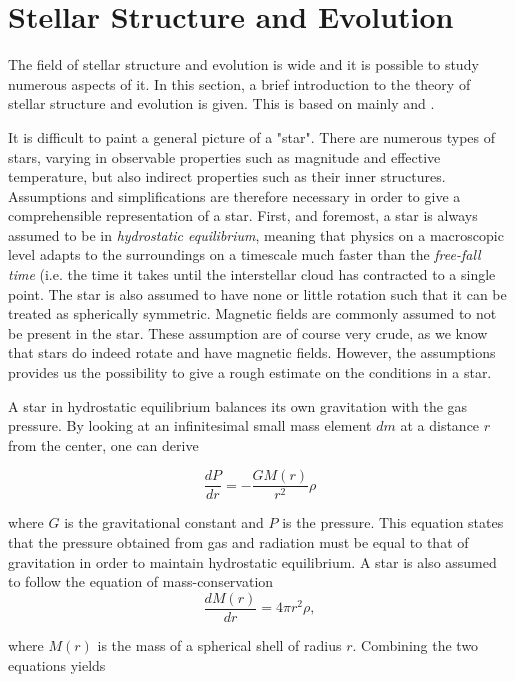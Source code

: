 \chapter{Stellar Structure and Evolution}
\label{stellarstruc}
The field of stellar structure and evolution is wide and it is possible to study numerous aspects of it. In this section, a brief introduction to the theory of stellar structure and evolution is given. This is based on mainly \citet{christensen2008lecture} and \citet{kippenhahn1990stellar}.   

It is difficult to paint a general picture of a "star". There are numerous types of stars, varying in observable properties such as magnitude and effective temperature, but also indirect properties such as their inner structures. Assumptions and simplifications are therefore necessary in order to  give a comprehensible  representation of a star. First, and foremost, a star is always assumed to be in \textit{hydrostatic equilibrium}, meaning that physics on a macroscopic level adapts to the surroundings on a timescale much faster than the \textit{free-fall time} (i.e. the time it takes until the interstellar cloud has contracted to a single point. The star is also assumed to have none or little rotation such that it can be treated as spherically symmetric. Magnetic fields are commonly assumed to not be present in the star. These assumption are of course very crude, as we know that stars do indeed rotate and have magnetic fields. However, the assumptions provides us the possibility to give a rough estimate on the conditions in a star. 

A star in hydrostatic equilibrium balances its own gravitation with the gas pressure. By looking at an infinitesimal small mass element $dm$ at a distance $r$ from the center, one can derive

\begin{equation}
    \frac{dP}{dr} = - \frac{GM(r)}{r^2}\rho
\end{equation}

\noindent where $G$ is the gravitational constant and $P$ is the pressure. This equation states that the pressure obtained from gas and radiation must be equal to that of gravitation in order to maintain hydrostatic equilibrium. A star is also assumed to follow the equation of mass-conservation 
\begin{equation}
    \frac{dM(r)}{dr}  = 4\pi r^2 \rho,
\end{equation}

\noindent where $M(r)$ is the mass of a spherical shell of  radius $r$. Combining the two equations yields


